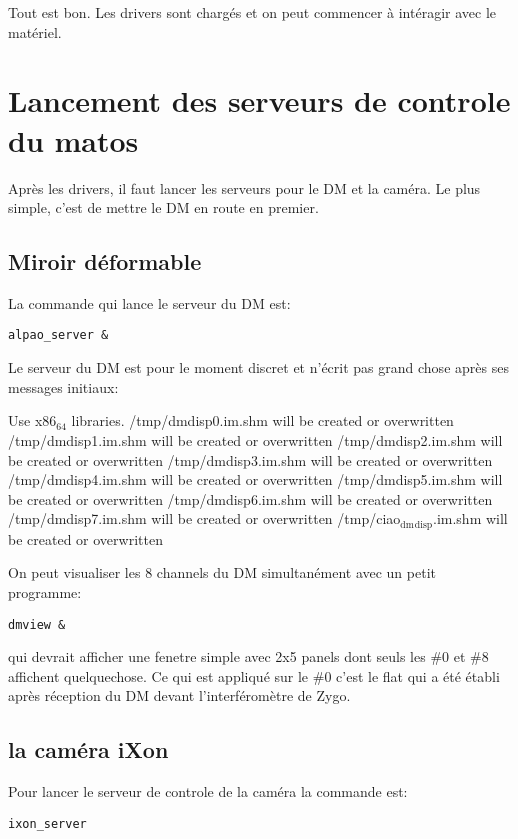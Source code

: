\documentclass[11pt]{article}
\begin{document}
Tout est bon. Les drivers sont chargés et on peut commencer à
intéragir avec le matériel.
\section{Lancement des serveurs de controle du matos}
\label{sec-2}


Après les drivers, il faut lancer les serveurs pour le DM et la
caméra. Le plus simple, c'est de mettre le DM en route en premier.
\subsection{Miroir déformable}
\label{sec-2-1}


La commande qui lance le serveur du DM est:


\begin{verbatim}
alpao_server &
\end{verbatim}

Le serveur du DM est pour le moment discret et n'écrit pas grand
chose après ses messages initiaux:

Use x86$_{\mathrm{64}}$ libraries.
/tmp/dmdisp0.im.shm will be created or overwritten
/tmp/dmdisp1.im.shm will be created or overwritten
/tmp/dmdisp2.im.shm will be created or overwritten
/tmp/dmdisp3.im.shm will be created or overwritten
/tmp/dmdisp4.im.shm will be created or overwritten
/tmp/dmdisp5.im.shm will be created or overwritten
/tmp/dmdisp6.im.shm will be created or overwritten
/tmp/dmdisp7.im.shm will be created or overwritten
/tmp/ciao$_{\mathrm{dm}}$$_{\mathrm{disp}}$.im.shm will be created or overwritten

On peut visualiser les 8 channels du DM simultanément avec un petit
programme:


\begin{verbatim}
dmview &
\end{verbatim}

qui devrait afficher une fenetre simple avec 2x5 panels dont seuls
les \#0 et \#8 affichent quelquechose. Ce qui est appliqué sur le \#0
c'est le flat qui a été établi après réception du DM devant
l'interféromètre de Zygo.
\subsection{la caméra iXon}
\label{sec-2-2}


Pour lancer le serveur de controle de la caméra la commande est:


\begin{verbatim}
ixon_server
\end{verbatim}
\end{document}
